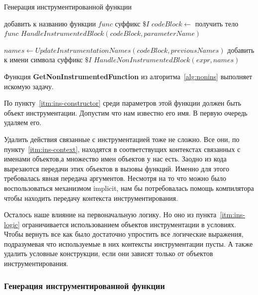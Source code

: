 \begin{algorithm}
\caption{Генерация инструментированной функции}\label{alg:ins}
\begin{algorithmic}[1]
  \State добавить к названию функции $func$ суффикс $\$I$
  \State $codeBlock \gets$ получить тело $func$
  \State $HandleInstrumentedBlock(codeBlock, parameterName)$
\EndFunction

  \State $names \gets UpdateInstrumentationNames(codeBlock, previousNames)$
      \State добавить к имени символа суффикс $\$I$
      \State $HandleNonInstrumentedBlock(expr, names)$
    \EndIf
  \EndFor
\EndFunction
\end{algorithmic}
\end{algorithm}

Функция \textbf{GetNonInstrumentedFunction} из алгоритма~\ref{alg:nonins}
выполняет искомую задачу.

По пункту~\ref{itm:ins-constructor} среди параметров этой функции должен быть
объект инструментации.
Допустим что нам известно его имя.
В первую очередь удаляем его.

Удалить действия связанные с инструментацией тоже не сложно.
Все они, по пункту~\ref{itm:ins-context}, находятся в соответствущих контекстах
связанных с именами объектов,а множество имен объектов у нас есть.
Заодно из кода вырезаются передачи этих объектов в вызовы функций.
Именно для этого требовалась явная передача аргументов.
Несмотря на то что можно было воспользоваться механизмом implicit,
нам бы потребовалась помощь компилятора чтобы находить передачу контекста
инструментирования.

Осталось наше влияние на первоначальную логику.
Но оно из пункта~\ref{itm:ins-logic} ограничивается использованием объектов
инструментации в условиях.
Чтобы вернуть все как было достаточно упростить все логические выражения,
подразумевая что используемые в них контексты инструментации пусты.
А также удалить условные конструкции, если они зависят только от объектов
инструментирования.

\subsubsection{Генерация инструментированной функции}

